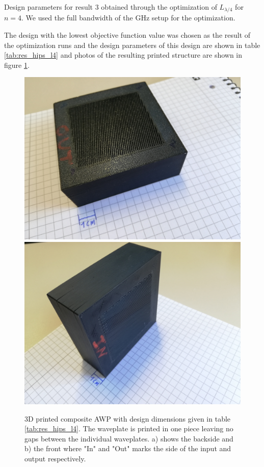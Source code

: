 \begin{table}[ht]
    \centering
    
    \caption{Design parameters for result 3 obtained through the optimization of $L_{\lambda/4}$ for $n=4$. We used the full bandwidth of the GHz setup for the optimization.}
    \label{tab:res_hips_l4}
\end{table}

The design with the lowest objective function value was chosen as the result of the optimization runs and the design parameters of this design are shown in table \ref{tab:res_hips_l4} and photos of the resulting printed structure are shown in figure \ref{fig:sent2david}.

\begin{figure}[H]
    \centering
    \subcaptionbox{\label{fig:sent2david_1}}
        {\includegraphics[width=0.47\linewidth]{images/5_chapter05/polymer/sent2david_1.jpg}}
    \subcaptionbox{\label{fig:sent2david_2}}
        {\includegraphics[width=0.47\linewidth]{images/5_chapter05/polymer/sent2david_2.jpg}}
    \caption{3D printed composite AWP with design dimensions given in table \ref{tab:res_hips_l4}. The waveplate is printed in one piece leaving no gaps between the individual waveplates. a) shows the backside and b) the front where "In" and "Out" marks the side of the input and output respectively.}
    \label{fig:sent2david}
\end{figure}

